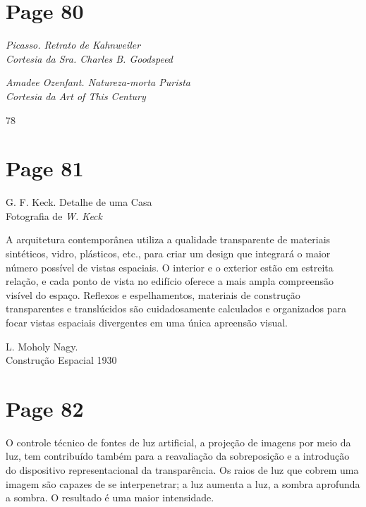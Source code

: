 \documentclass[a4paper]{article}
\begin{document}
\vfill %

\newpage
\section*{Page 80}

\raggedright

\vspace*{2.5in} %

\textit{Picasso. Retrato de Kahnweiler}\\
{\small\textit{Cortesia da Sra. Charles B. Goodspeed}}

\vspace*{3in} %

\textit{Amadee Ozenfant. Natureza-morta Purista}\\
{\small\textit{Cortesia da Art of This Century}}

\vfill %

78

\newpage
\section*{Page 81}

\noindent G. F. Keck. Detalhe de uma Casa \\
Fotografia de \textit{W. Keck}

A arquitetura contemporânea utiliza a qualidade transparente de materiais sintéticos, vidro, plásticos, etc., para criar um design que integrará o maior número possível de vistas espaciais. O interior e o exterior estão em estreita relação, e cada ponto de vista no edifício oferece a mais ampla compreensão visível do espaço. Reflexos e espelhamentos, materiais de construção transparentes e translúcidos são cuidadosamente calculados e organizados para focar vistas espaciais divergentes em uma única apreensão visual.

\noindent L. Moholy Nagy. \\
Construção Espacial 1930

\newpage
\section*{Page 82}

O controle técnico de fontes de luz artificial, a projeção de imagens por meio da luz, tem contribuído também para a reavaliação da sobreposição e a introdução do dispositivo representacional da transparência. Os raios de luz que cobrem uma imagem são capazes de se interpenetrar; a luz aumenta a luz, a sombra aprofunda a sombra. O resultado é uma maior intensidade.
\end{document}
